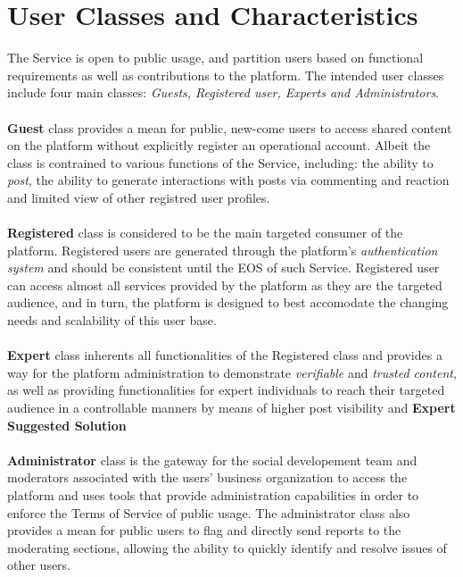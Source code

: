     \section{User Classes and Characteristics}
    The Service is open to public usage, and partition users based on functional requirements as well as contributions to the platform.
    The intended user classes include four main classes: \textit{Guests, Registered user, Experts and Administrators}.
    \\\\
    \textbf{Guest} class provides a mean for public, new-come users to access shared content on the platform without explicitly register an operational account. Albeit the class
    is contrained to various functions of the Service, including: the ability to \textit{post}, the ability to generate interactions with posts via commenting and reaction and limited view of other registred user profiles.
    \\\\
    \textbf{Registered} class is considered to be the main targeted consumer of the platform. Registered users are generated through the platform's \textit{authentication system} and should be consistent
    until the \ac{EOS} of such Service. Registered user can access almost all services provided by the platform as they are the targeted audience, and in turn, the platform is designed
    to best accomodate the changing needs and scalability of this user base.
    \\\\
    \textbf{Expert} class inherents all functionalities of the Registered class and provides a way for the platform administration to demonstrate \textit{verifiable} and \textit{trusted content}, as well as providing functionalities
    for expert individuals to reach their targeted audience in a controllable manners by means of higher post visibility and \textbf{Expert Suggested Solution}
    \\\\
    \textbf{Administrator} class is the gateway for the social developement team and moderators associated with the users' business organization to access the platform and uses tools that provide administration capabilities
    in order to enforce the Terms of Service of public usage. The administrator class also provides a mean for public users to flag and directly send reports to the moderating sections, allowing the ability to 
    quickly identify and resolve issues of other users.

